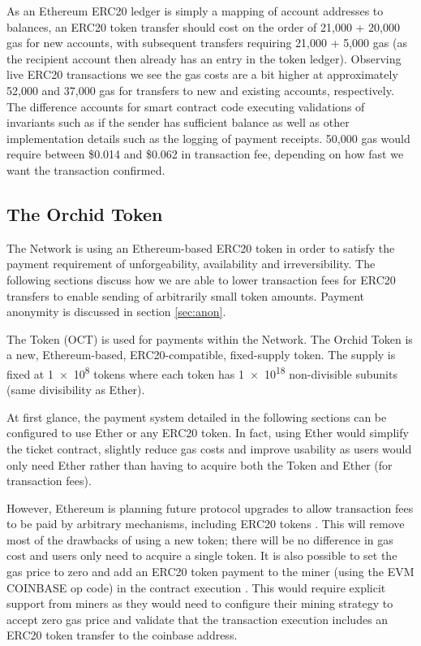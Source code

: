 As an Ethereum ERC20 ledger is simply a mapping of account addresses to balances, an ERC20 token transfer should cost on the order of 21,000 + 20,000 gas for new accounts, with subsequent transfers requiring 21,000 + 5,000 gas (as the recipient account then already has an entry in the token ledger). Observing live\cite{LiveERC20} ERC20 transactions we see the gas costs are a bit higher at approximately 52,000 and 37,000 gas for transfers to new and existing accounts, respectively. The difference accounts for smart contract code executing validations of invariants such as if the sender has sufficient balance as well as other implementation details such as the logging of payment receipts. 50,000 gas would require between \$0.014 and \$0.062 in transaction fee, depending on how fast we want the transaction confirmed.

\subsection{The Orchid Token}
\label{sec:oct}

The \Orchid{} Network is using an Ethereum-based ERC20 token in order to satisfy the payment requirement of unforgeability, availability and irreversibility. The following sections discuss how we are able to lower transaction fees for ERC20 transfers to enable sending of arbitrarily small token amounts. Payment anonymity is discussed in section \ref{sec:anon}.

The \Orchid{} Token (OCT) is used for payments within the \Orchid{} Network. The Orchid Token is a new, Ethereum-based, ERC20-compatible, fixed-supply token. The supply is fixed at \num{1e8} tokens where each token has \num{1e18} non-divisible subunits (same divisibility as Ether).

At first glance, the \Orchid{} payment system detailed in the following sections can be configured to use Ether or any ERC20 token. In fact, using Ether would simplify the ticket contract, slightly reduce gas costs and improve usability as users would only need Ether rather than having to acquire both the \Orchid{} Token and Ether (for transaction fees).

However, Ethereum is planning future protocol upgrades to allow transaction fees to be paid by arbitrary mechanisms, including ERC20 tokens \cite{ETHAbstractions} \cite{ETHSerenity}. This will remove most of the drawbacks of using a new token; there will be no difference in gas cost and users only need to acquire a single token. It is also possible to set the gas price to zero and add an ERC20 token payment to the miner (using the EVM COINBASE\cite{ETHSpec} op code) in the contract execution \cite{ETHTokenFees}. This would require explicit support from miners as they would need to configure their mining strategy to accept zero gas price and validate that the transaction execution includes an ERC20 token transfer to the coinbase address.

